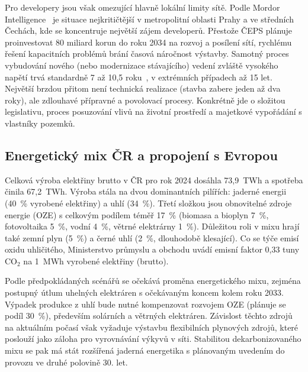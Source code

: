 Pro developery jsou však omezující hlavně lokální limity sítě. Podle Mordor Intelligence~\cite{mordor_intelligence_czechia_2025} je situace nejkritičtější v metropolitní oblasti Prahy a ve středních Čechách, kde se koncentruje největší zájem developerů. Přestože ČEPS plánuje proinvestovat 80 miliard korun do roku 2034 na rozvoj a posílení sítí, rychlému řešení kapacitních problémů brání časová náročnost výstavby. Samotný proces vybudování nového (nebo modernizace stávajícího) vedení zvláště vysokého napětí trvá standardně 7 až 10,5 roku~\cite{vlcek_energeticky_2012}, v extrémních případech až 15 let. Největší brzdou přitom není technická realizace (stavba zabere jeden až dva roky), ale zdlouhavé přípravné a povolovací procesy. Konkrétně jde o složitou legislativu, proces posuzování vlivů na životní prostředí a majetkové vypořádání s vlastníky pozemků.~\cite{vlcek_energeticky_2012, klimova_grid_2025}


\subsection{Energetický mix ČR a propojení s Evropou}
\label{subsec:cz_energie_mix}

Celková výroba elektřiny brutto v ČR pro rok 2024 dosáhla 73,9~TWh a spotřeba činila 67,2~TWh. Výroba stála na dvou dominantních pilířích: jaderné energii (40~\% vyrobené elektřiny) a uhlí (34~\%). Třetí složkou jsou obnovitelné zdroje energie (OZE) s celkovým podílem téměř 17~\% (biomasa a bioplyn 7~\%, fotovoltaika 5~\%, vodní 4~\%, větrné elektrárny 1~\%). Důležitou roli v mixu hrají také zemní plyn (5~\%) a černé uhlí (2~\%, dlouhodobě klesající). Co se týče emisí oxidu uhličitého, Ministerstvo průmyslu a obchodu uvádí emisní faktor 0,33 tuny CO$_2$ na 1~MWh vyrobené elektřiny (brutto).~\cite{energeticky_regulacni_urad_rocni_2025, bufka_hodnota_2026}

Podle předpokládaných scénářů se očekává proměna energetického mixu, zejména postupný útlum uhelných elektráren s očekávaným koncem kolem roku 2033. Výpadek produkce z uhlí bude nutné kompenzovat rozvojem OZE (plánuje se podíl 30~\%), především solárních a větrných elektráren. Závislost těchto zdrojů na aktuálním počasí však vyžaduje výstavbu flexibilních plynových zdrojů, které poslouží jako záloha pro vyrovnávání výkyvů v síti. Stabilitou dekarbonizovaného mixu se pak má stát rozšířená jaderná energetika s plánovaným uvedením do provozu ve druhé polovině 30. let.~\cite[kap. 2 a 6]{bartos_energetika_2025}

